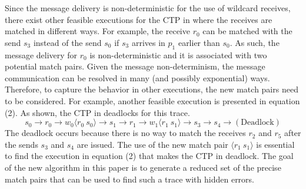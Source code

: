 Since the message delivery is non-deterministic for the use of wildcard receives, there exist other feasible executions for the CTP in  where the receives are matched in different ways. For example,  the receive $r_0$ can be matched with the send $s_3$ instead of the send $s_0$ if $s_3$ arrives in $p_1$ earlier than $s_0$. As such, the message delivery for $r_0$ is non-deterministic and it is associated with two potential match pairs. 
Given the message non-determinism, the message communication can be resolved in many (and possibly exponential) ways. 
Therefore, to capture the behavior in other executions, the new match pairs need to be considered.
For example, another feasible execution is presented in equation (2). As shown, the CTP in  deadlocks for this trace. 
\begin{equation}
s_0\rightarrow r_0\rightarrow w_0\langle r_0\ s_0\rangle \rightarrow s_1\rightarrow r_1\rightarrow w_1\langle r_1\ s_1\rangle \rightarrow s_3\rightarrow s_4 \rightarrow (\mathrm{Deadlock})
\end{equation} 
The deadlock occurs because there is no way to match the receives $r_2$ and $r_5$ after the sends $s_3$ and $s_4$ are issued. The use of the new match pair $\langle r_1\ s_1\rangle$ is essential to find the execution in equation (2) that makes the CTP in  deadlock.
The goal of the new algorithm in this paper is to generate a reduced set of the precise match pairs that can be used to find such a trace with hidden errors.

